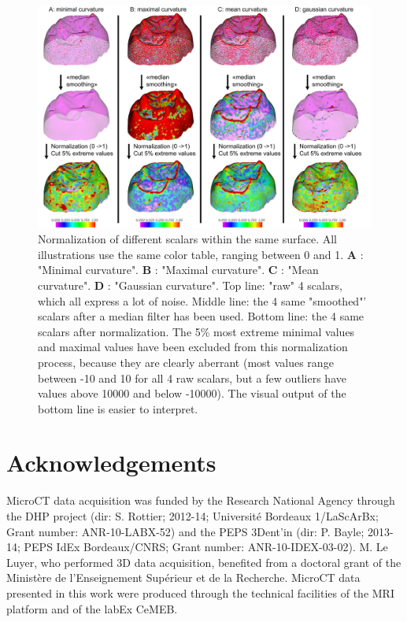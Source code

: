 \documentclass[12pt, a4paper]{book}
\begin{document}
\begin{figure}
  \centering
  \includegraphics[scale=0.26]{normalization_example.jpg} 
	\caption{ 
Normalization of different scalars within the same surface. All illustrations use the same color table, ranging between 0 and 1.  \textbf{A} : "Minimal curvature".  \textbf{B} : "Maximal curvature". \textbf{C} : "Mean curvature". \textbf{D} : "Gaussian curvature". Top line: "raw" 4 scalars, which all express a lot of noise. Middle line: the 4 same "smoothed"' scalars after a median filter has been used. Bottom line: the 4 same scalars after normalization. The 5\% most extreme minimal values and maximal values have been excluded from this normalization process, because they are clearly aberrant (most values range between -10 and 10 for all 4 raw scalars, but a few outliers have values above 10000 and below -10000). The visual output of the bottom line is easier to interpret.	
	}
\label{normalization_example}
\end{figure}

\section{Acknowledgements}
MicroCT data acquisition was funded by the Research National Agency through the DHP project (dir: S. Rottier; 2012-14; Université Bordeaux 1/LaScArBx; Grant number: ANR-10-LABX-52) and the PEPS 3Dent’in (dir: P. Bayle; 2013-14; PEPS IdEx Bordeaux/CNRS; Grant number: ANR-10-IDEX-03-02). M. Le Luyer, who performed 3D data acquisition, benefited from a doctoral grant of the Ministère de l’Enseignement Supérieur et de la Recherche. MicroCT data presented in this work were produced through the technical facilities of the MRI platform and of the labEx CeMEB.




	
\end{document}
